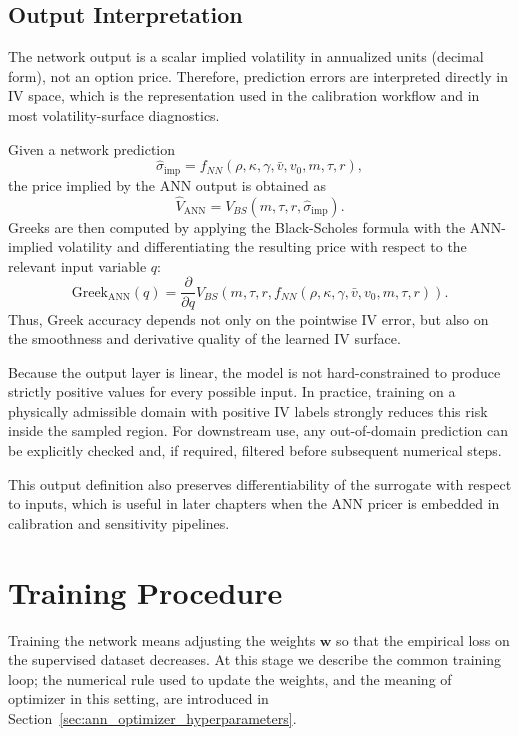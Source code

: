 \subsection{Output Interpretation}
The network output is a scalar implied volatility in annualized units (decimal form), not an option price. Therefore, prediction errors are interpreted directly in IV space, which is the representation used in the calibration workflow and in most volatility-surface diagnostics.

Given a network prediction
\[
\hat\sigma_{\mathrm{imp}} = f_{NN}(\rho,\kappa,\gamma,\bar v,v_0,m,\tau,r),
\]
the price implied by the ANN output is obtained as
\[
\hat V_{\mathrm{ANN}} =
V_{BS}(m,\tau,r,\hat\sigma_{\mathrm{imp}}).
\]
Greeks are then computed by applying the Black-Scholes formula with the ANN-implied volatility and differentiating the resulting price with respect to the relevant input variable \(q\):
\begin{equation}
\label{eq:ann_greek_composed_map}
\mathrm{Greek}_{\mathrm{ANN}}(q)
=
\frac{\partial}{\partial q}
V_{BS}\!\left(m,\tau,r,f_{NN}(\rho,\kappa,\gamma,\bar v,v_0,m,\tau,r)\right).
\end{equation}
Thus, Greek accuracy depends not only on the pointwise IV error, but also on the smoothness and derivative quality of the learned IV surface.

Because the output layer is linear, the model is not hard-constrained to produce strictly positive values for every possible input. In practice, training on a physically admissible domain with positive IV labels strongly reduces this risk inside the sampled region. For downstream use, any out-of-domain prediction can be explicitly checked and, if required, filtered before subsequent numerical steps.

This output definition also preserves differentiability of the surrogate with respect to inputs, which is useful in later chapters when the ANN pricer is embedded in calibration and sensitivity pipelines.

\section{Training Procedure}
Training the network means adjusting the weights \(\mathbf{w}\) so that the empirical loss on the supervised dataset decreases. At this stage we describe the common training loop; the numerical rule used to update the weights, and the meaning of optimizer in this setting, are introduced in Section~\ref{sec:ann_optimizer_hyperparameters}.

